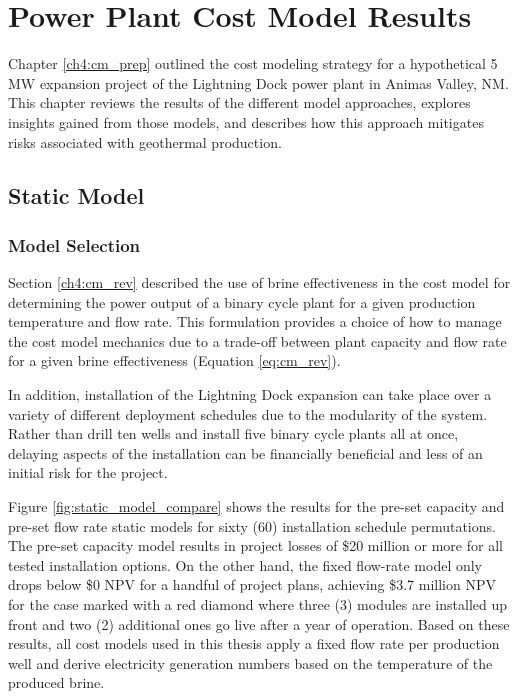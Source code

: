 \chapter{Power Plant Cost Model Results}\label{ch6:cm_results}

Chapter \ref{ch4:cm_prep} outlined the cost modeling strategy for a hypothetical 5 MW expansion project of the Lightning Dock power plant in Animas Valley, NM. This chapter reviews the results of the different model approaches, explores insights gained from those models, and describes how this approach mitigates risks associated with geothermal production.

\section{Static Model}
\label{ch6:static_mod}

\subsection{Model Selection}
\label{ch6:static_select}

Section \ref{ch4:cm_rev} described the use of brine effectiveness in the cost model for determining the power output of a binary cycle plant for a given production temperature and flow rate. This formulation provides a choice of how to manage the cost model mechanics due to a trade-off between plant capacity and flow rate for a given brine effectiveness (Equation \ref{eq:cm_rev}).

In addition, installation of the Lightning Dock expansion can take place over a variety of different deployment schedules due to the modularity of the system. Rather than drill ten wells and install five binary cycle plants all at once, delaying aspects of the installation can be financially beneficial and less of an initial risk for the project.  

Figure \ref{fig:static_model_compare} shows the results for the pre-set capacity and pre-set flow rate static models for sixty (60) installation schedule permutations. The pre-set capacity model results in project losses of \$20 million or more for all tested installation options. On the other hand, the fixed flow-rate model only drops below \$0 NPV for a handful of project plans, achieving \$3.7 million NPV for the case marked with a red diamond where three (3) modules are installed up front and two (2) additional ones go live after a year of operation. Based on these results, all cost models used in this thesis apply a fixed flow rate per production well and derive electricity generation numbers based on the temperature of the produced brine.

